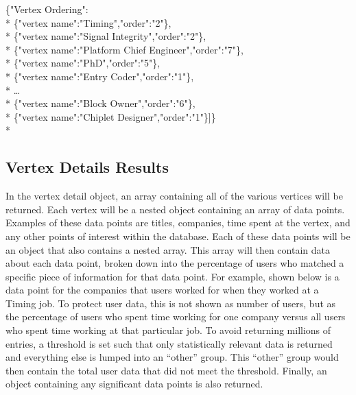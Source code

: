 \begin{tt}
\begin{footnotesize}
\noindent \{"Vertex Ordering":\\*
	\indent\{"vertex name":"Timing","order":"2"\},\\*
	\indent\{"vertex name":"Signal Integrity","order":"2"\},\\*
	\indent\{"vertex name":"Platform Chief Engineer","order":"7"\},\\*
	\indent\{"vertex name":"PhD","order":"5"\},\\*
	\indent\{"vertex name":"Entry Coder","order":"1"\},\\*
	\indent\ldots\\*
	\indent\{"vertex name":"Block Owner","order":"6"\},\\*
	\indent\{"vertex name":"Chiplet Designer","order":"1"\}]\}\\*
\end{footnotesize}
\end{tt}

\subsection{Vertex Details Results}
In the vertex detail object, an array containing all of the various vertices
will be returned.  Each vertex will be a nested object containing an array of data
points.  Examples of these data points are titles, companies, time spent at the
vertex, and any other points of interest within the database.  Each of these
data points will be an object that also contains a nested array.  This array
will then contain data about each data point, broken down into the percentage of
users who matched a specific piece of information for that data point.  For
example, shown below is a data point for the companies that users worked for
when they worked at a Timing job.  To protect user data, this is not shown as
number of users, but as the percentage of users who spent time working for one
company versus all users who spent time working at that particular job.  To
avoid returning millions of entries, a threshold is set such that only
statistically relevant data is returned and everything else is lumped into an
``other'' group.  This ``other'' group would then contain the total user data
that did not meet the threshold.  Finally, an object containing any significant
data points is also returned.

